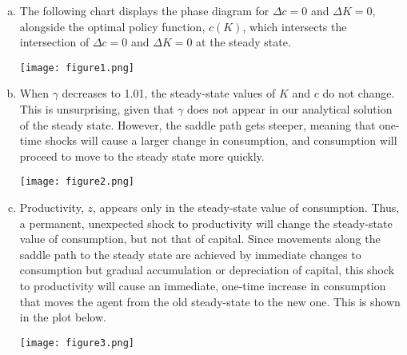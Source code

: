 \documentclass{article}
\begin{document}
\begin{enumerate}[(a)]
	\item The following chart displays the phase diagram for ${\Delta c=0}$ and ${\Delta K=0}$, alongside the optimal policy function, $c(K)$, which intersects the intersection of ${\Delta c=0}$ and ${\Delta K=0}$ at the steady state.
		\begin{center}
			\texttt{[image: figure1.png]}
		\end{center}
	
	\item When $\gamma$ decreases to 1.01, the steady-state values of $K$ and $c$ do not change. This is unsurprising, given that $\gamma$ does not appear in our analytical solution of the steady state. However, the saddle path gets steeper, meaning that one-time shocks will cause a larger change in consumption, and consumption will proceed to move to the steady state more quickly.
		\begin{center}
			\texttt{[image: figure2.png]}
		\end{center}
	
	\item Productivity, $z$, appears only in the steady-state value of consumption. Thus, a permanent, unexpected shock to productivity will change the steady-state value of consumption, but not that of capital. Since movements along the saddle path to the steady state are achieved by immediate changes to consumption but gradual accumulation or depreciation of capital, this shock to productivity will cause an immediate, one-time increase in consumption that moves the agent from the old steady-state to the new one. This is shown in the plot below.
		\begin{center}
			\texttt{[image: figure3.png]}
		\end{center}
	
\end{enumerate}

\end{document}

